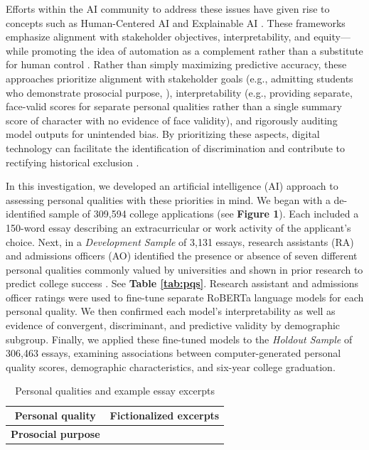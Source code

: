 \documentclass[11pt]{report}
\begin{document}
\begin{mainf}
Efforts within the AI community to address these issues have given rise to concepts such as Human-Centered AI \cite{riedl_humancentered_2019, shneiderman_human-centered_2020} and Explainable AI \cite{gunning_xaiexplainable_2019}. 
These frameworks emphasize alignment with stakeholder objectives, interpretability, and equity---while promoting the idea of automation as a complement rather than a substitute for human control \cite{shneiderman_human-centered_2020}. 
    Rather than simply maximizing predictive accuracy, these approaches prioritize alignment with stakeholder goals (e.g., admitting students who demonstrate prosocial purpose, \cite{noauthor_our_2021}), interpretability (e.g., providing separate, face-valid scores for separate personal qualities rather than a single summary score of character with no evidence of face validity), and rigorously auditing model outputs for unintended bias. By prioritizing these aspects, digital technology can facilitate the identification of discrimination and contribute to rectifying historical exclusion \cite{lobel_equality_2022}.

In this investigation, we developed an artificial intelligence (AI) approach to assessing personal qualities with these priorities in mind. 
We began with a de-identified sample of 309,594 college applications (see \textbf{Figure 1}). Each included a 150-word essay describing an extracurricular or work activity of the applicant’s choice. Next, in a \textit{Development Sample} of 3,131 essays, research assistants (RA) and admissions officers (AO) identified the presence or absence of seven different personal qualities commonly valued by universities and shown in prior research to predict college success \cite{almlund_personality_2011}. See \textbf{Table \ref{tab:pqs}}. Research assistant and admissions officer ratings were used to fine-tune separate RoBERTa language models \cite{liu_roberta_2019} for each personal quality. We then confirmed each model’s interpretability as well as evidence of convergent, discriminant, and predictive validity by demographic subgroup. Finally, we applied these fine-tuned models to the \textit{Holdout Sample} of 306,463 essays, examining associations between computer-generated personal quality scores, demographic characteristics, and six-year college graduation.

\begin{table}[ht]
\small
\caption{Personal qualities and example essay excerpts}
\def\arraystretch{1}%
\begin{tabular}{  p{.275\linewidth}  p{.675\linewidth}}
\hline
\multicolumn{1}{c}{\textbf{Personal quality}} & \multicolumn{1}{c}{\textbf{Fictionalized excerpts}}\\                                                                      \hline
\textbf{Prosocial purpose}


\end{tabular}
\end{table}
\end{mainf}
\end{document}
